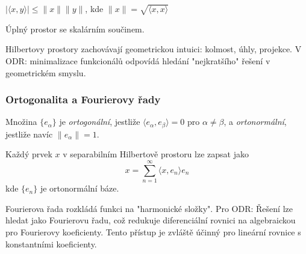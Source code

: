 \begin{theorem}
$|\langle x,y \rangle| \leq \|x\| \|y\|$, kde $\|x\| = \sqrt{\langle x,x \rangle}$
\end{theorem}

\begin{definition}
Úplný prostor se skalárním součinem.
\end{definition}

\begin{intuition}
Hilbertovy prostory zachovávají geometrickou intuici: kolmost, úhly, projekce. V ODR: minimalizace funkcionálů odpovídá hledání "nejkratšího" řešení v geometrickém smyslu.
\end{intuition}

\subsubsection{Ortogonalita a Fourierovy řady}

\begin{definition}
Množina $\{e_\alpha\}$ je \emph{ortogonální}, jestliže $\langle e_\alpha, e_\beta \rangle = 0$ pro $\alpha \neq \beta$, a \emph{ortonormální}, jestliže navíc $\|e_\alpha\| = 1$.
\end{definition}

\begin{theorem}
Každý prvek $x$ v separabilním Hilbertově prostoru lze zapsat jako
\[
x = \sum_{n=1}^\infty \langle x, e_n \rangle e_n
\]
kde $\{e_n\}$ je ortonormální báze.
\end{theorem}

\begin{intuition}
Fourierova řada rozkládá funkci na "harmonické složky". Pro ODR: Řešení lze hledat jako Fourierovu řadu, což redukuje diferenciální rovnici na algebraickou pro Fourierovy koeficienty. Tento přístup je zvláště účinný pro lineární rovnice s konstantními koeficienty.
\end{intuition}

